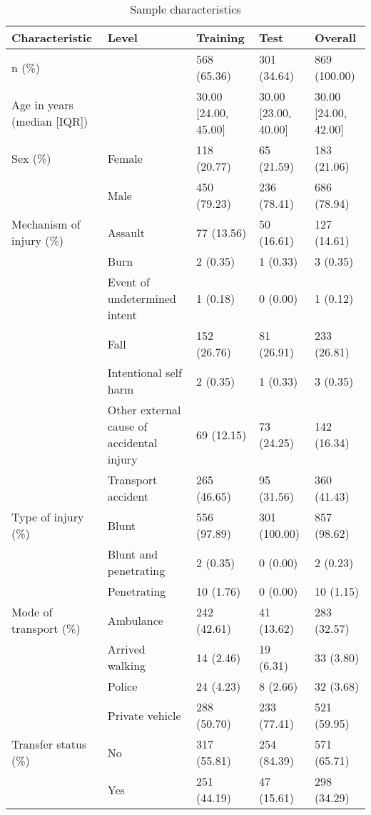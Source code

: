 \documentclass[10pt,letterpaper]{article}\usepackage[]{graphicx}\usepackage[]{color}
\begin{document}
\begin{table}[ht]
\centering
\caption{Sample characteristics} 
\label{tab:sample-characteristics}
\begin{adjustbox}{max width=\textwidth} 
\begin{tabular} 
{lllll}
  \hline
Characteristic & Level & Training & Test & Overall \\ 
  \hline
n (\%) &  & 568 (65.36) & 301 (34.64) & 869 (100.00) \\ 
  Age in years (median [IQR]) &  & 30.00 [24.00, 45.00] & 30.00 [23.00, 40.00] & 30.00 [24.00, 42.00] \\ 
  Sex (\%) & Female & 118 (20.77) & 65 (21.59) & 183 (21.06) \\ 
   & Male & 450 (79.23) & 236 (78.41) & 686 (78.94) \\ 
  Mechanism of injury (\%) & Assault & 77 (13.56) & 50 (16.61) & 127 (14.61) \\ 
   & Burn & 2 (0.35) & 1 (0.33) & 3 (0.35) \\ 
   & Event of undetermined intent & 1 (0.18) & 0 (0.00) & 1 (0.12) \\ 
   & Fall & 152 (26.76) & 81 (26.91) & 233 (26.81) \\ 
   & Intentional self harm & 2 (0.35) & 1 (0.33) & 3 (0.35) \\ 
   & Other external cause of accidental injury & 69 (12.15) & 73 (24.25) & 142 (16.34) \\ 
   & Transport accident & 265 (46.65) & 95 (31.56) & 360 (41.43) \\ 
  Type of injury (\%) & Blunt & 556 (97.89) & 301 (100.00) & 857 (98.62) \\ 
   & Blunt and penetrating & 2 (0.35) & 0 (0.00) & 2 (0.23) \\ 
   & Penetrating & 10 (1.76) & 0 (0.00) & 10 (1.15) \\ 
  Mode of transport (\%) & Ambulance & 242 (42.61) & 41 (13.62) & 283 (32.57) \\ 
   & Arrived walking & 14 (2.46) & 19 (6.31) & 33 (3.80) \\ 
   & Police & 24 (4.23) & 8 (2.66) & 32 (3.68) \\ 
   & Private vehicle & 288 (50.70) & 233 (77.41) & 521 (59.95) \\ 
  Transfer status (\%) & No & 317 (55.81) & 254 (84.39) & 571 (65.71) \\ 
   & Yes & 251 (44.19) & 47 (15.61) & 298 (34.29) \\ 

\end{tabular}
\end{adjustbox}
\end{table}
\end{document}
